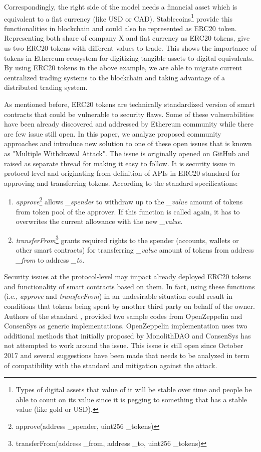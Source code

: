 Correspondingly, the right side of the model needs a financial asset which is equivalent to a fiat currency (like USD or CAD). Stablecoins\footnote{Types of digital assets that value of it will be stable over time and people be able to count on its value since it is pegging to something that has a stable value (like gold or USD).} provide this functionalities in blockchain and could also be represented as ERC20 token. Representing both share of company X and fiat currency as ERC20 tokens, give us two ERC20 tokens with different values to trade. This shows the importance of tokens in Ethereum ecosystem for digitizing tangible assets to digital equivalents. By using ERC20 tokens in the above example, we are able to migrate current centralized trading systems to the blockchain and taking advantage of a distributed trading system.

As mentioned before, ERC20 tokens are technically standardized version of smart contracts that could be vulnerable to security flaws. Some of these vulnerabilities have been already discovered and addressed by Ethereum community while there are few issue still open. In this paper, we analyze proposed community approaches and introduce new solution to one of these open issues that is known as "Multiple Withdrawal Attack". The issue is originally opened on GitHub\cite{Ref13} and raised as separate thread\cite{Ref07} for making it easy to follow. It is security issue in protocol-level and originating from definition of APIs in ERC20 standard for approving and transferring tokens. According to the standard specifications:
\begin{enumerate}
\item \textit{approve}\footnote{approve(address \_spender, uint256 \_tokens)} allows \textit{\_spender} to withdraw up to the \textit{\_value} amount of tokens from token pool of the approver. If this function is called again, it has to overwrites the current allowance with the new \textit{\_value}.
\item \textit{transferFrom}\footnote{transferFrom(address \_from, address \_to, uint256 \_tokens)} grants required rights to the spender (accounts, wallets or other smart contracts) for transferring \textit{\_value} amount of tokens from address \textit{\_from} to address \textit{\_to}.\newline
\end{enumerate}

Security issues at the protocol-level may impact already deployed ERC20 tokens and functionality of smart contracts based on them. In fact, using these functions (i.e., \textit{approve} and \textit{transferFrom}) in an undesirable situation could result in conditions that tokens being spent by another third party on behalf of the owner. Authors of the standard \cite{Ref08}, provided two sample codes from OpenZeppelin\cite{Ref10} and ConsenSys\cite{Ref11} as generic implementations. OpenZeppelin implementation uses two additional methods that initially proposed by MonolithDAO\cite{Ref12} and ConsenSys has not attempted to work around the issue. This issue is still open since October 2017 and several suggestions have been made that needs to be analyzed in term of compatibility with the standard and mitigation against the attack.
